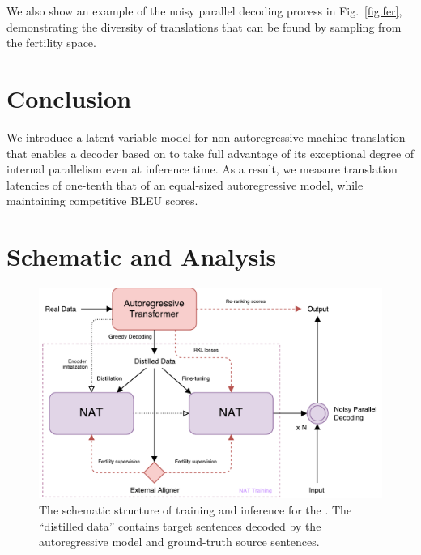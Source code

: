 \documentclass{article} %
\begin{document}
We also show an example of the noisy parallel decoding process in Fig.~\ref{fig.fer}, demonstrating the diversity of translations that can be found by sampling from the fertility space.

\section{Conclusion}
We introduce a latent variable model for non-autoregressive machine translation that enables a decoder based on \citet{vaswani2017attention} to take full advantage of its exceptional degree of internal parallelism even at inference time. As a result, we measure translation latencies of one-tenth that of an equal-sized autoregressive model, while maintaining competitive BLEU scores.





\newpage
\appendix
\section{Schematic and Analysis}


\begin{figure}[htbp]
\centering
\includegraphics[width=\textwidth]{figures/NAT-overall}
\caption{The schematic structure of training and inference for the \model. The ``distilled data'' contains target sentences decoded by the autoregressive model and ground-truth source sentences.}
\end{figure}
\end{document}

